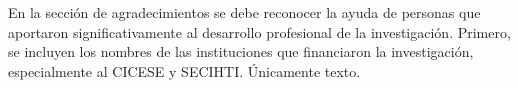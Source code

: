 
\hspace{12pt}

En la sección de agradecimientos se debe reconocer la ayuda de personas que aportaron significativamente al desarrollo profesional de la investigación. Primero, se incluyen los nombres de las instituciones que financiaron la investigación, especialmente al CICESE y SECIHTI. Únicamente texto. 